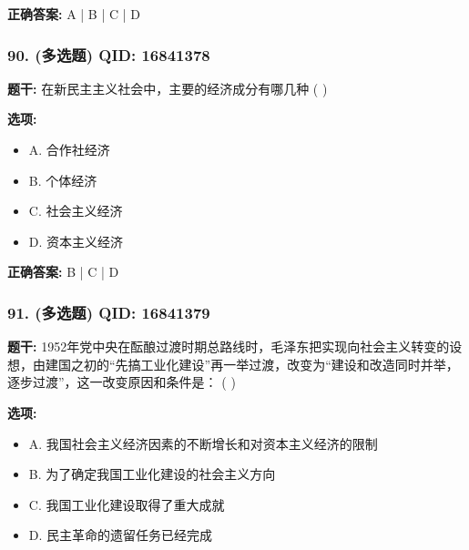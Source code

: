 \documentclass[12pt,UTF8]{ctexart}
\begin{document}
\textbf{正确答案:}
A | B | C | D

\vspace{0.3em}\hrulefill\vspace{0.7em}

\subsubsection*{90. (多选题) \small QID: 16841378}

\textbf{题干:}
在新民主主义社会中，主要的经济成分有哪几种 ( )

\textbf{选项:}
\begin{itemize}[leftmargin=*]

  \item A. 合作社经济

  \item B. 个体经济

  \item C. 社会主义经济

  \item D. 资本主义经济

\end{itemize}

\textbf{正确答案:}
B | C | D

\vspace{0.3em}\hrulefill\vspace{0.7em}

\subsubsection*{91. (多选题) \small QID: 16841379}

\textbf{题干:}
1952年党中央在酝酿过渡时期总路线时，毛泽东把实现向社会主义转变的设想，由建国之初的“先搞工业化建设”再一举过渡，改变为“建设和改造同时并举，逐步过渡”，这一改变原因和条件是： ( )

\textbf{选项:}
\begin{itemize}[leftmargin=*]

  \item A. 我国社会主义经济因素的不断增长和对资本主义经济的限制

  \item B. 为了确定我国工业化建设的社会主义方向

  \item C. 我国工业化建设取得了重大成就

  \item D. 民主革命的遗留任务已经完成

\end{itemize}
\end{document}

